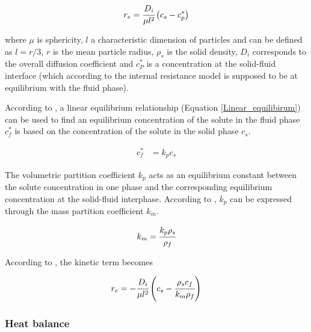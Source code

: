 \documentclass[../Article_Model_Parameters.tex]{subfiles}
\begin{document}
			{\footnotesize
				\begin{equation} \label{Model_kinetic_basic}
					r_e = \cfrac{D_i}{\mu l^2 }\left(c_s - c_p^* \right)
			\end{equation} }
			
			where $\mu$ is sphericity, $l$ a characteristic dimension of particles and can be defined as $l = r/3$, $r$ is the mean particle radius, $\rho_s$ is the solid density, $D_i$ corresponds to the overall diffusion coefficient and $c_P^*$ is a concentration at the solid-fluid interface (which according to the internal resistance model is supposed to be at equilibrium with the fluid phase). 
			
			According to \citet{Bulley1984}, a linear equilibrium relationship (Equation  \ref{Linear_equilibirum}) can be used to find an equilibrium concentration of the solute in the fluid phase $c_f^*$ is based on the concentration of the solute in the solid phase $c_s$.
			
			{\footnotesize
				\begin{align} \label{Linear_equilibirum}
					c_f^* &= k_p c_s
			\end{align} }
			
			The volumetric partition coefficient $k_p$ acts as an equilibrium constant between the solute concentration in one phase and the corresponding equilibrium concentration at the solid-fluid interphase. According to \citet{Spiro2007}, $k_p$ can be expressed through the mass partition coefficient $k_m$.
			
			{\footnotesize
				\begin{align}
					k_m = \cfrac{k_p \rho_s}{\rho_f}
			\end{align} }
			
			According to \citet{Reverchon1996}, the kinetic term becomes
			
			{\footnotesize
				\begin{equation}
					\label{Model_kinetic_no_sat}
					r_e = -\cfrac{D_i}{ \mu l^2 } \left(c_s - \cfrac{\rho_s c_f}{k_m \rho_f} \right)
			\end{equation} }
			
			
			
			\subsubsection{Heat balance} \label{CH: heat_balance}
			
\end{document}

